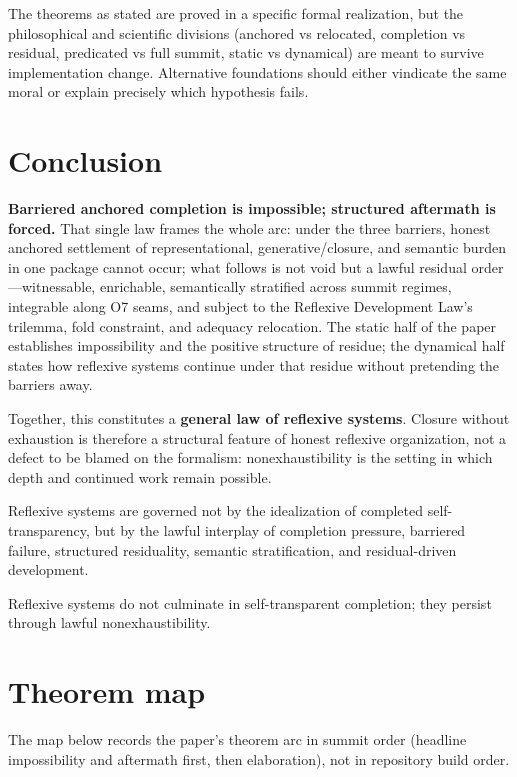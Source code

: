\documentclass[11pt]{article}
\theoremstyle{plain}
\theoremstyle{definition}
\theoremstyle{remark}
\begin{document}
The theorems as stated are proved in a specific formal realization, but the philosophical and scientific divisions (anchored vs relocated, completion vs residual, predicated vs full summit, static vs dynamical) are meant to survive implementation change. Alternative foundations should either vindicate the same moral or explain precisely which hypothesis fails.

\section{Conclusion}

\noindent\textbf{Barriered anchored completion is impossible; structured aftermath is forced.} That single law frames the whole arc: under the three barriers, honest anchored settlement of representational, generative/closure, and semantic burden in one package cannot occur; what follows is not void but a lawful residual order---witnessable, enrichable, semantically stratified across summit regimes, integrable along O7 seams, and subject to the Reflexive Development Law's trilemma, fold constraint, and adequacy relocation. The static half of the paper establishes impossibility and the positive structure of residue; the dynamical half states how reflexive systems continue under that residue without pretending the barriers away.

\noindent Together, this constitutes a \textbf{general law of reflexive systems}. Closure without exhaustion is therefore a structural feature of honest reflexive organization, not a defect to be blamed on the formalism: nonexhaustibility is the setting in which depth and continued work remain possible.

\noindent Reflexive systems are governed not by the idealization of completed self-transparency, but by the lawful interplay of completion pressure, barriered failure, structured residuality, semantic stratification, and residual-driven development.

\noindent Reflexive systems do not culminate in self-transparent completion; they persist through lawful nonexhaustibility.

\appendix

\section{Theorem map}

\noindent The map below records the paper's theorem arc in summit order (headline impossibility and aftermath first, then elaboration), not in repository build order.
\end{document}
